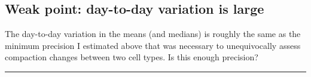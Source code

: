 \documentclass[12pt, a4paper]{article}
\begin{document}
\subsection{Weak point: day-to-day variation is large}
\label{sec-4-5}
The day-to-day variation in the means (and medians) is roughly the
same as the minimum precision I estimated above that was necessary
to unequivocally assess compaction changes between two cell
types. Is this enough precision?

\rule{\linewidth}{0.5pt}
\end{document}
